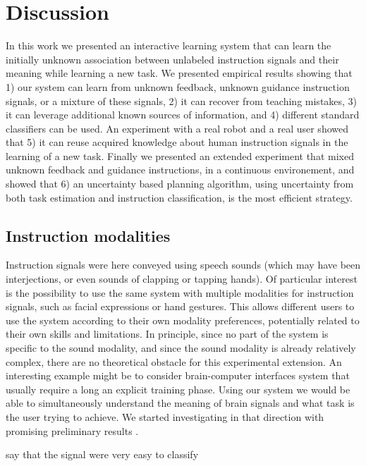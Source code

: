 \section{Discussion}

In this work we presented an interactive learning system that can learn the initially unknown association between unlabeled instruction signals and their meaning while learning a new task. We presented empirical results showing that 1) our system can learn from unknown feedback, unknown guidance instruction signals, or a mixture of these signals, 2) it can recover from teaching mistakes, 3) it can leverage additional known sources of information, and 4) different standard classifiers can be used. An experiment with a real robot and a real user showed that 5) it can reuse acquired knowledge about human instruction signals in the learning of a new task. Finally we presented an extended experiment that mixed unknown feedback and guidance instructions, in a continuous environement, and showed that 6) an uncertainty based planning algorithm, using uncertainty from both task estimation and instruction classification, is the most efficient strategy.

\subsection{Instruction modalities} Instruction signals were here conveyed using speech sounds (which may have been interjections, or even sounds of clapping or tapping hands). Of particular interest is the possibility to use the same system with multiple modalities for instruction signals, such as facial expressions or hand gestures. This allows different users to use the system according to their own modality preferences, potentially related to their own skills and limitations. In principle, since no part of the system is specific to the sound modality, and since the sound modality is already relatively complex, there are no theoretical obstacle for this experimental extension. An interesting example might be to consider brain-computer interfaces system \cite{chavarriaga2010learning, iturrate2010robot} that usually require a long an explicit training phase. Using our system we would be able to simultaneously understand the meaning of brain signals and what task is the user trying to achieve. We started investigating in that direction with promising preliminary results \cite{grizou2013zero}.



say that the signal were very easy to classify




